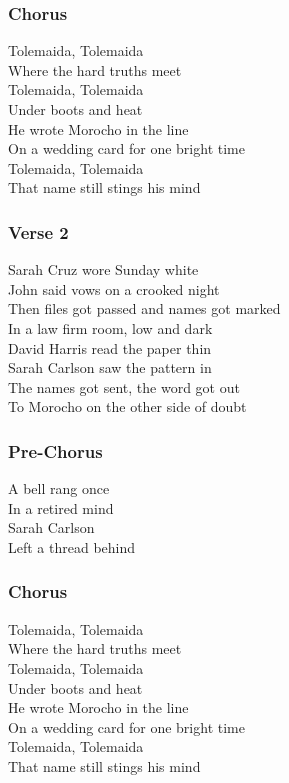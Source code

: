 \subsubsection{Chorus}\label{chorus-26}

Tolemaida, Tolemaida\\
Where the hard truths meet\\
Tolemaida, Tolemaida\\
Under boots and heat\\
He wrote Morocho in the line\\
On a wedding card for one bright time\\
Tolemaida, Tolemaida\\
That name still stings his mind

\subsubsection{Verse 2}\label{verse-2-9}

Sarah Cruz wore Sunday white\\
John said vows on a crooked night\\
Then files got passed and names got marked\\
In a law firm room, low and dark\\
David Harris read the paper thin\\
Sarah Carlson saw the pattern in\\
The names got sent, the word got out\\
To Morocho on the other side of doubt

\subsubsection{Pre-Chorus}\label{pre-chorus-9}

A bell rang once\\
In a retired mind\\
Sarah Carlson\\
Left a thread behind

\subsubsection{Chorus}\label{chorus-27}

Tolemaida, Tolemaida\\
Where the hard truths meet\\
Tolemaida, Tolemaida\\
Under boots and heat\\
He wrote Morocho in the line\\
On a wedding card for one bright time\\
Tolemaida, Tolemaida\\
That name still stings his mind

